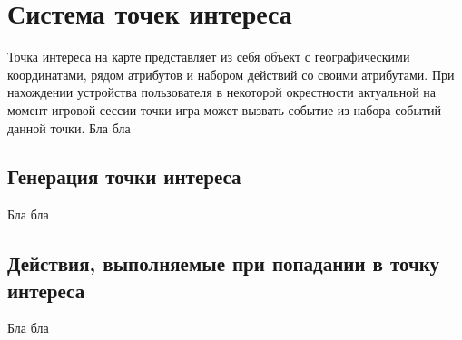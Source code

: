 \section{Система точек интереса}
\label{sec:geofencing}
Точка интереса на карте представляет из себя объект с географическими координатами, рядом атрибутов и набором действий со своими атрибутами. При нахождении устройства пользователя в некоторой окрестности актуальной на момент игровой сессии точки игра может вызвать событие из набора событий данной точки.
Бла бла
\subsection*{Генерация точки интереса}
Бла бла
\subsection*{Действия, выполняемые при попадании в точку интереса}
Бла бла